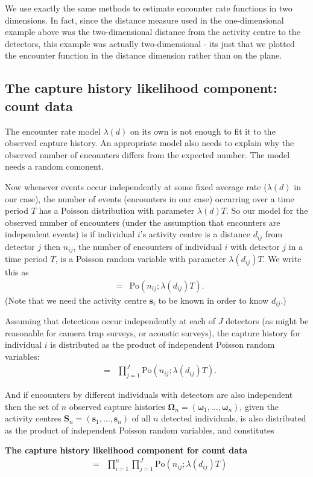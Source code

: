 \documentclass[graybox,envcountchap,sectrefs]{SpringerStyleFiles/styles/svmono}\usepackage[]{graphicx}\usepackage[]{color}
\newcommand{\be}{\begin{eqnarray}}
\newcommand{\ee}{\end{eqnarray}}
\begin{document}
\afterpage{\clearpage}

We use exactly the same methods to estimate encounter rate functions in two dimensions. In fact, since the distance measure used in the one-dimensional example above was the two-dimensional distance from the activity centre to the detectors, this example was actually two-dimensional - its just that we plotted the encounter function in the distance dimension rather than on the plane.

\subsection{The capture history likelihood component: count data}
\label{subsec:ER+detfun.ERlikelihood}

The encounter rate model $\lambda(d)$ on its own is not enough to fit it to the observed capture history. An appropriate model also needs to explain why the observed number of encounters differs from the expected number. The model needs a random comonent. 

Now whenever events occur independently at some fixed average rate ($\lambda(d)$ in our case), the number of events (encounters in our case) occurring over a time period $T$ has a Poisson distribution with parameter $\lambda(d)T$. So our model for the observed number of encounters (under the assumption that encounters are independent events) is if individual $i$'s activity centre is a distance $d_{ij}$ from detector $j$ then $n_{ij}$, the number of encounters of individual $i$ with detector $j$ in a time period $T$, is a Poisson random variable with parameter $\lambda(d_{ij})T$. We write this as
\be
[n_{ij}|\bm{s}_i]&=&\mbox{Po}\left(n_{ij};\lambda(d_{ij})T\right).
\ee
\noindent
(Note that we need the activity centre $\bm{s}_i$ to be known in order to know $d_{ij}$.)

Assuming that detections occur independently at each of $J$ detectors (as might be reasonable for camera trap surveys, or acoustic surveys), the capture history for individual $i$ is distributed as the product of independent Poisson random variables:
\be
[\bm{\omega}_i|\bm{s}_i]&=&\prod_{j=1}^J\mbox{Po}\left(n_{ij};\lambda(d_{ij})T\right).
\ee

And if encounters by different individuals with detectors are also independent then the set of $n$ observed capture histories $\bm{\Omega}_n=(\bm{\omega}_1,\ldots,\bm{\omega}_n)$, given the activity centres $\bm{S}_n=(\bm{s}_1,\ldots,\bm{s}_n)$ of all $n$ detected individuals, is also distributed as the product of independent Poisson random variables, and constitutes 
\begin{svgraybox}
\bf{The capture history likelihood component for count data}
\be
[\bm{\Omega}_n|\bm{S}_n]&=&\prod_{i=1}^n\prod_{j=1}^J\mbox{Po}\left(n_{ij};\lambda(d_{ij})T\right)
\label{eq:ER+detfun.P.Omega.count}
\ee
\end{svgraybox}
\end{document}

